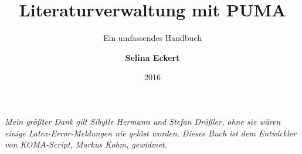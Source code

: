 \documentclass[b5paper,11pt,twoside]{scrbook} %
\begin{document}
 
    \title{\Huge Literaturverwaltung mit PUMA}
    \subtitle{\Large Ein umfassendes Handbuch}
    \author{\textbf{Selina Eckert}}
    \date{2016}

\maketitle
\newpage
\textit{Mein größter Dank gilt Sibylle Hermann und Stefan Drößler, ohne sie wären einige Latex-Error-Meldungen nie gelöst worden.}\newline
\textit{Dieses Buch ist dem Entwickler von KOMA-Script, Markus Kohm, gewidmet.}%
\clearpage
\tableofcontents 
\setcounter{secnumdepth}{3} 
\setcounter{tocdepth}{3} 
\newpage
{} 








 



\renewcommand{\indexname}{Stichwortverzeichnis}
\printindex
\end{document}
